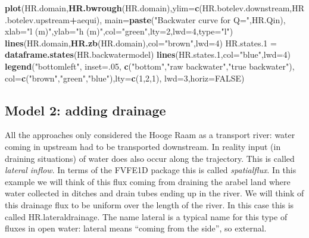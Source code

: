 \documentclass[
]{article}
\newenvironment{Shaded}{\begin{snugshade}}{\end{snugshade}}
\newcommand{\AttributeTok}[1]{\textcolor[rgb]{0.13,0.29,0.53}{#1}}
\newcommand{\ConstantTok}[1]{\textcolor[rgb]{0.56,0.35,0.01}{#1}}
\newcommand{\DecValTok}[1]{\textcolor[rgb]{0.00,0.00,0.81}{#1}}
\newcommand{\FloatTok}[1]{\textcolor[rgb]{0.00,0.00,0.81}{#1}}
\newcommand{\FunctionTok}[1]{\textcolor[rgb]{0.13,0.29,0.53}{\textbf{#1}}}
\newcommand{\NormalTok}[1]{#1}
\newcommand{\OtherTok}[1]{\textcolor[rgb]{0.56,0.35,0.01}{#1}}
\newcommand{\SpecialCharTok}[1]{\textcolor[rgb]{0.81,0.36,0.00}{\textbf{#1}}}
\newcommand{\StringTok}[1]{\textcolor[rgb]{0.31,0.60,0.02}{#1}}
\begin{document}
\begin{Shaded}
\begin{Highlighting}[]
\FunctionTok{plot}\NormalTok{(HR.domain,}\FunctionTok{HR.bwrough}\NormalTok{(HR.domain),}\AttributeTok{ylim=}\FunctionTok{c}\NormalTok{(HR.botelev.downstream,HR.botelev.upstream}\SpecialCharTok{+}\NormalTok{aequi),}
     \AttributeTok{main=}\FunctionTok{paste}\NormalTok{(}\StringTok{"Backwater curve for Q="}\NormalTok{,HR.Qin),}
     \AttributeTok{xlab=}\StringTok{"l (m)"}\NormalTok{,}\AttributeTok{ylab=}\StringTok{"h (m)"}\NormalTok{,}\AttributeTok{col=}\StringTok{"green"}\NormalTok{,}\AttributeTok{lty=}\DecValTok{2}\NormalTok{,}\AttributeTok{lwd=}\DecValTok{4}\NormalTok{,}\AttributeTok{type=}\StringTok{"l"}\NormalTok{)}
\FunctionTok{lines}\NormalTok{(HR.domain,}\FunctionTok{HR.zb}\NormalTok{(HR.domain),}\AttributeTok{col=}\StringTok{"brown"}\NormalTok{,}\AttributeTok{lwd=}\DecValTok{4}\NormalTok{)}
\NormalTok{HR.states}\FloatTok{.1} \OtherTok{=} \FunctionTok{dataframe.states}\NormalTok{(HR.backwatermodel)}
\FunctionTok{lines}\NormalTok{(HR.states}\FloatTok{.1}\NormalTok{,}\AttributeTok{col=}\StringTok{"blue"}\NormalTok{,}\AttributeTok{lwd=}\DecValTok{4}\NormalTok{)}
\FunctionTok{legend}\NormalTok{(}\StringTok{"bottomleft"}\NormalTok{, }\AttributeTok{inset=}\NormalTok{.}\DecValTok{05}\NormalTok{,}
       \FunctionTok{c}\NormalTok{(}\StringTok{"bottom"}\NormalTok{,}\StringTok{"raw backwater"}\NormalTok{,}\StringTok{"true backwater"}\NormalTok{), }
       \AttributeTok{col=}\FunctionTok{c}\NormalTok{(}\StringTok{"brown"}\NormalTok{,}\StringTok{"green"}\NormalTok{,}\StringTok{"blue"}\NormalTok{),}\AttributeTok{lty=}\FunctionTok{c}\NormalTok{(}\DecValTok{1}\NormalTok{,}\DecValTok{2}\NormalTok{,}\DecValTok{1}\NormalTok{),}
       \AttributeTok{lwd=}\DecValTok{3}\NormalTok{,}\AttributeTok{horiz=}\ConstantTok{FALSE}\NormalTok{)}
\end{Highlighting}
\end{Shaded}

\hypertarget{model-2-adding-drainage}{%
\subsection{Model 2: adding drainage}\label{model-2-adding-drainage}}

All the approaches only considered the Hooge Raam as a transport river:
water coming in upstream had to be transported downstream. In reality
input (in draining situations) of water does also occur along the
trajectory. This is called \emph{lateral inflow}. In terms of the FVFE1D
package this is called \emph{spatialflux}. In this example we will think
of this flux coming from draining the arabel land where water collected
in ditches and drain tubes ending up in the river. We will think of this
drainage flux to be uniform over the length of the river. In this case
this is called HR.lateraldrainage. The name lateral is a typical name
for this type of fluxes in open water: lateral means ``coming from the
side'', so external.
\end{document}
